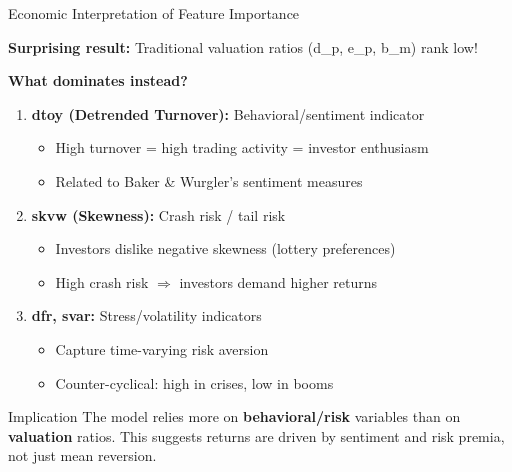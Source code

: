 \documentclass[10pt]{beamer}
\newcommand{\highlight}[1]{\textcolor{AccentOrange}{\textbf{#1}}}
\begin{document}
\begin{frame}{Economic Interpretation of Feature Importance}

  \textbf{Surprising result:} Traditional valuation ratios (d\_p, e\_p, b\_m) rank low!

  \vspace{0.5em}
  \textbf{What dominates instead?}

  \begin{enumerate}
    \item \textbf{dtoy (Detrended Turnover):} Behavioral/sentiment indicator
    \begin{itemize}
      \item High turnover = high trading activity = investor enthusiasm
      \item Related to Baker \& Wurgler's sentiment measures
    \end{itemize}

    \vspace{0.3em}
    \item \textbf{skvw (Skewness):} Crash risk / tail risk
    \begin{itemize}
      \item Investors dislike negative skewness (lottery preferences)
      \item High crash risk $\Rightarrow$ investors demand higher returns
    \end{itemize}

    \vspace{0.3em}
    \item \textbf{dfr, svar:} Stress/volatility indicators
    \begin{itemize}
      \item Capture time-varying risk aversion
      \item Counter-cyclical: high in crises, low in booms
    \end{itemize}
  \end{enumerate}

  \vspace{0.3em}
  \begin{block}{Implication}
    The model relies more on \highlight{behavioral/risk} variables than on \highlight{valuation} ratios. This suggests returns are driven by sentiment and risk premia, not just mean reversion.
  \end{block}
\end{frame}

\end{document}
